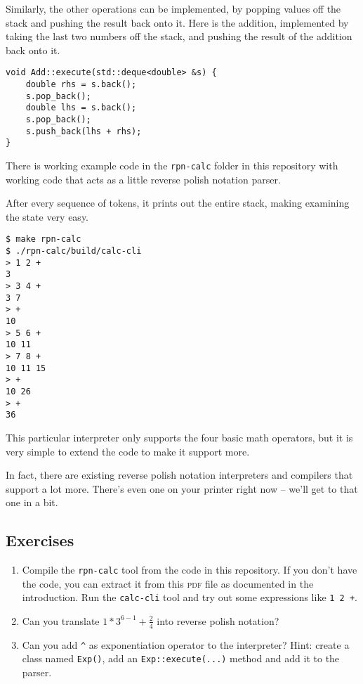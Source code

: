 \documentclass[a4paper,twocolumn]{article}
\begin{document}
Similarly, the other operations can be implemented, by popping values off the stack and pushing the result back onto it. Here is the addition, implemented by taking the last two numbers off the stack, and pushing the result of the addition back onto it.

\begin{verbatim}
void Add::execute(std::deque<double> &s) {
    double rhs = s.back();
    s.pop_back();
    double lhs = s.back();
    s.pop_back();
    s.push_back(lhs + rhs);
}  
\end{verbatim}

There is working example code in the \verb|rpn-calc| folder in this repository with working code that acts as a little reverse polish notation parser.

After every sequence of tokens, it prints out the entire stack, making examining the state very easy.

\begin{verbatim}
$ make rpn-calc
$ ./rpn-calc/build/calc-cli
> 1 2 +
3
> 3 4 +
3 7
> +
10
> 5 6 +
10 11
> 7 8 +
10 11 15
> +
10 26
> +
36
\end{verbatim}

This particular interpreter only supports the four basic math operators, but it is very simple to extend the code to make it support more.

In fact, there are existing reverse polish notation interpreters and compilers that support a lot more. There's even one on your printer right now -- we'll get to that one in a bit.

\subsection*{Exercises}

\begin{enumerate}
  \item Compile the \verb|rpn-calc| tool from the code in this repository. If you don't have the code, you can extract it from this \textsc{pdf} file as documented in the introduction. Run the \verb|calc-cli| tool and try out some expressions like \verb|1 2 +|.
  \item Can you translate $1 * 3^{6 - 1} + \frac{2}{4}$ into reverse polish notation?
  \item Can you add \verb|^| as exponentiation operator to the interpreter? Hint: create a class named \verb|Exp()|, add an \verb|Exp::execute(...)| method and add it to the parser.
\end{enumerate}
\end{document}
